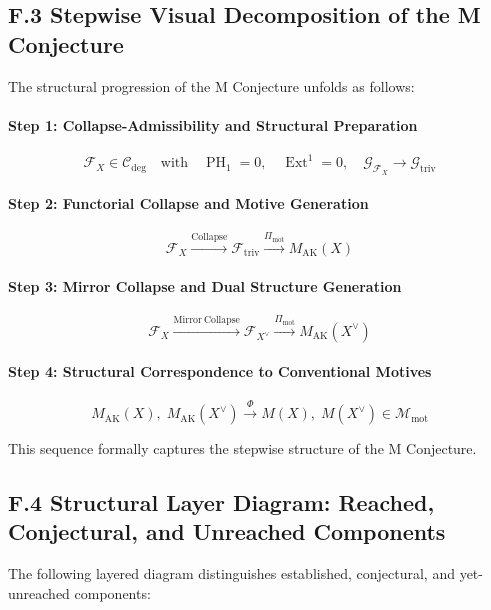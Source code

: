 \documentclass[11pt]{article}
\DeclareMathOperator{\Ext}{Ext}
\DeclareMathOperator{\PH}{PH}
\begin{document}
\subsection*{F.3 Stepwise Visual Decomposition of the M Conjecture}

The structural progression of the M Conjecture unfolds as follows:

\paragraph{Step 1: Collapse-Admissibility and Structural Preparation}

\[
\mathcal{F}_X \in \mathcal{C}_{\mathrm{deg}} \quad \text{with} \quad \PH_1 = 0, \quad \Ext^1 = 0, \quad \mathcal{G}_{\mathcal{F}_X} \longrightarrow \mathcal{G}_{\mathrm{triv}}
\]

\paragraph{Step 2: Functorial Collapse and Motive Generation}

\[
\mathcal{F}_X \xrightarrow{\mathrm{Collapse}} \mathcal{F}_{\mathrm{triv}} \xrightarrow{\Pi_{\mathrm{mot}}} M_{\mathrm{AK}}(X)
\]

\paragraph{Step 3: Mirror Collapse and Dual Structure Generation}

\[
\mathcal{F}_X \xrightarrow{\mathrm{Mirror\ Collapse}} \mathcal{F}_{X^\vee} \xrightarrow{\Pi_{\mathrm{mot}}} M_{\mathrm{AK}}(X^\vee)
\]

\paragraph{Step 4: Structural Correspondence to Conventional Motives}

\[
M_{\mathrm{AK}}(X), \; M_{\mathrm{AK}}(X^\vee) \xrightarrow{\Phi} M(X), \; M(X^\vee) \in \mathcal{M}_{\mathrm{mot}}
\]

This sequence formally captures the stepwise structure of the M Conjecture.

\subsection*{F.4 Structural Layer Diagram: Reached, Conjectural, and Unreached Components}

The following layered diagram distinguishes established, conjectural, and yet-unreached components:
\end{document}
